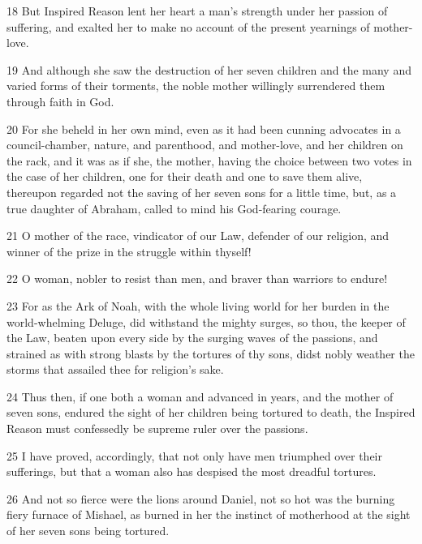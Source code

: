 \par 18 But Inspired Reason lent her heart a man's strength under her passion of suffering, and exalted her to make no account of the present yearnings of mother-love.

\par 19 And although she saw the destruction of her seven children and the many and varied forms of their torments, the noble mother willingly surrendered them through faith in God.

\par 20 For she beheld in her own mind, even as it had been cunning advocates in a council-chamber, nature, and parenthood, and mother-love, and her children on the rack, and it was as if she, the mother, having the choice between two votes in the case of her children, one for their death and one to save them alive, thereupon regarded not the saving of her seven sons for a little time, but, as a true daughter of Abraham, called to mind his God-fearing courage.

\par 21 O mother of the race, vindicator of our Law, defender of our religion, and winner of the prize in the struggle within thyself!

\par 22 O woman, nobler to resist than men, and braver than warriors to endure!

\par 23 For as the Ark of Noah, with the whole living world for her burden in the world-whelming Deluge, did withstand the mighty surges, so thou, the keeper of the Law, beaten upon every side by the surging waves of the passions, and strained as with strong blasts by the tortures of thy sons, didst nobly weather the storms that assailed thee for religion's sake.

\par 24 Thus then, if one both a woman and advanced in years, and the mother of seven sons, endured the sight of her children being tortured to death, the Inspired Reason must confessedly be supreme ruler over the passions.

\par 25 I have proved, accordingly, that not only have men triumphed over their sufferings, but that a woman also has despised the most dreadful tortures.

\par 26 And not so fierce were the lions around Daniel, not so hot was the burning fiery furnace of Mishael, as burned in her the instinct of motherhood at the sight of her seven sons being tortured.


